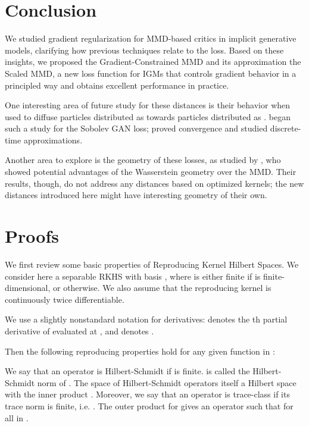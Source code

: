 \documentclass{article}
\let\citep\parencite
\begin{document}
\section{Conclusion}
We studied gradient regularization for MMD-based critics in implicit generative models,
clarifying how previous techniques relate to the  loss.
Based on these insights,
we proposed the Gradient-Constrained MMD and its approximation the Scaled MMD,
a new loss function for IGMs that controls gradient behavior in a principled way
and obtains excellent performance in practice.

One interesting area of future study for these distances is their behavior
when used to diffuse particles distributed as  towards particles distributed as .
\Textcite[Appendix A.1]{sobolev-gan} began such a study for the Sobolev GAN loss; \cite{sobolev-descent} proved convergence and studied discrete-time approximations.

Another area to explore is the geometry of these losses,
as studied by \textcite{Bottou:2017},
who showed potential advantages of the Wasserstein geometry over the MMD.
Their results, though, do not address any distances based on optimized kernels;
the new distances introduced here
might have interesting geometry of their own.



\printbibliography

\clearpage
\appendix



\section{Proofs} \label{appendix:proofs}

We first review some basic properties of Reproducing Kernel Hilbert
Spaces. We consider here a separable RKHS  with basis ,
where  is either finite if  is finite-dimensional, or 
otherwise. We also assume that the reproducing kernel  is continuously
twice differentiable.

We use a slightly nonstandard notation for derivatives:
 denotes the th partial derivative of  evaluated at ,
and 
denotes .

Then the following reproducing properties hold for
any given function  in  \citep[Lemma 4.34]{SteChr08}:



We say that an operator  is Hilbert-Schmidt if 
is finite.  is called the Hilbert-Schmidt norm
of . The space of Hilbert-Schmidt operators itself a Hilbert space
with the inner product .
Moreover, we say that an operator  is trace-class if its trace
norm is finite, i.e. .
The outer product  for 
gives an  operator such that
 for all  in .
\end{document}
